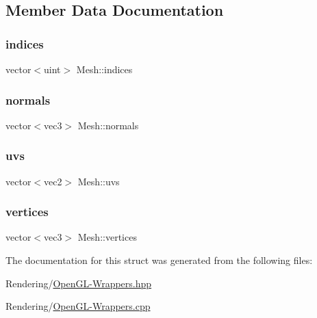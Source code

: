 \subsection{Member Data Documentation}
\mbox{\label{structMesh_a1bf53bf594529c21e428a0f8d93976bf}} 
\subsubsection{\texorpdfstring{indices}{indices}}
{\footnotesize\ttfamily vector$<$uint$>$ Mesh\+::indices}

\mbox{\label{structMesh_a7f23733d1225e7c875f21b74699d0220}} 
\subsubsection{\texorpdfstring{normals}{normals}}
{\footnotesize\ttfamily vector$<$vec3$>$ Mesh\+::normals}

\mbox{\label{structMesh_a3819d7dd33b2b3d32f20bbaafe063fd0}} 
\subsubsection{\texorpdfstring{uvs}{uvs}}
{\footnotesize\ttfamily vector$<$vec2$>$ Mesh\+::uvs}

\mbox{\label{structMesh_adcb6c07f7b25f91163901b6ac08aefe6}} 
\subsubsection{\texorpdfstring{vertices}{vertices}}
{\footnotesize\ttfamily vector$<$vec3$>$ Mesh\+::vertices}



The documentation for this struct was generated from the following files\+:\begin{DoxyCompactItemize}
\item 
Rendering/\mbox{\hyperlink{OpenGL-Wrappers_8hpp}{Open\+G\+L-\/\+Wrappers.\+hpp}}\item 
Rendering/\mbox{\hyperlink{OpenGL-Wrappers_8cpp}{Open\+G\+L-\/\+Wrappers.\+cpp}}\end{DoxyCompactItemize}
